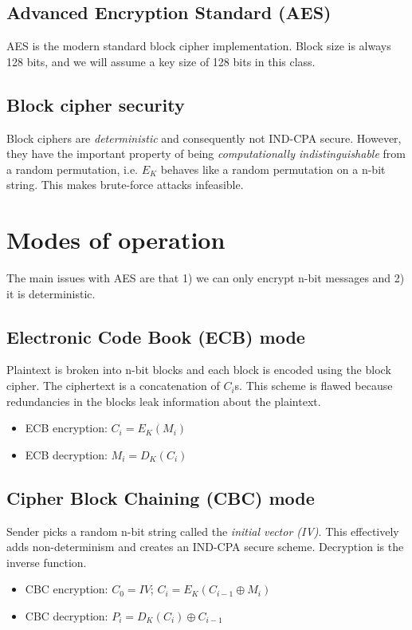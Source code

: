 \subsection{Advanced Encryption Standard (AES)}
AES is the modern standard block cipher implementation. Block size is always 128 bits, and we will assume a key size of 128 bits in this class.

\subsection{Block cipher security}
Block ciphers are \emph{deterministic} and consequently not IND-CPA secure. However, they have the important property of being \emph{computationally indistinguishable} from a random permutation, i.e. $E_K$ behaves like a random permutation on a n-bit string. This makes brute-force attacks infeasible.

\section{Modes of operation}
The main issues with AES are that 1) we can only encrypt n-bit messages and 2) it is deterministic.

\subsection{Electronic Code Book (ECB) mode}
Plaintext is broken into n-bit blocks and each block is encoded using the block cipher. The ciphertext is a concatenation of $C_i$s. This scheme is flawed because redundancies in the blocks leak information about the plaintext.
\begin{itemize}
    \item ECB encryption: $C_i = E_K(M_i)$
    \item ECB decryption: $M_i = D_K(C_i)$
\end{itemize}

\subsection{Cipher Block Chaining (CBC) mode}
Sender picks a random n-bit string called the \emph{initial vector (IV)}. This effectively adds non-determinism and creates an IND-CPA secure scheme. Decryption is the inverse function.
\begin{itemize}
    \item CBC encryption: $C_0 = IV$; $C_i = E_K(C_{i-1} \oplus M_i)$
    \item CBC decryption: $P_i = D_K(C_i) \oplus C_{i-1}$
\end{itemize}

